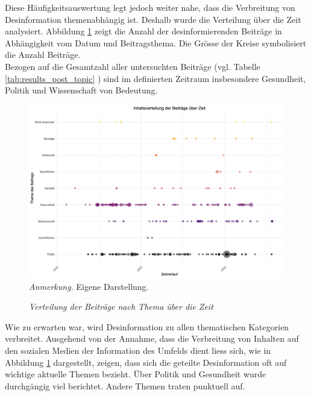 \documentclass[12pt,a4paper]{article}        %
\begin{document}
Diese Häufigkeitsauswertung legt jedoch weiter nahe, dass die Verbreitung von Desinformation themenabhängig ist. Deshalb wurde die Verteilung über die Zeit analysiert. Abbildung \ref{fig:results_date_dependency} zeigt die Anzahl der desinformierenden Beiträge in Abhängigkeit vom Datum und Beitragsthema. Die Grösse der Kreise symbolisiert die Anzahl Beiträge. \\
Bezogen auf die Gesamtzahl aller untersuchten Beiträge (vgl. Tabelle \ref{tab:results_post_topic}  ) sind im definierten Zeitraum insbesondere Gesundheit, Politik und Wissenschaft von Bedeutung.
\begin{figure}[H]
  \caption{\textit{Verteilung der Beiträge nach Thema über die Zeit}}
  \label{fig:results_date_dependency}
  \centering
  \includegraphics[width=1\linewidth]{images/date_dependency_plot.png}
  \footnotesize\textit{Anmerkung.} Eigene Darstellung.
\end{figure}

Wie zu erwarten war, wird Desinformation zu allen thematischen Kategorien verbreitet. Ausgehend von der Annahme, dass die Verbreitung von Inhalten auf den sozialen Medien der Information des Umfelds dient \parencites[77]{lecheler_disinformation_2022}{subramanian_meet_2017} liess sich, wie in Abbildung \ref{fig:results_date_dependency} dargestellt, zeigen, dass sich die geteilte Desinformation oft auf wichtige aktuelle Themen bezieht.
Über Politik und Gesundheit wurde durchgängig viel berichtet. Andere Themen traten punktuell auf.
\end{document}
